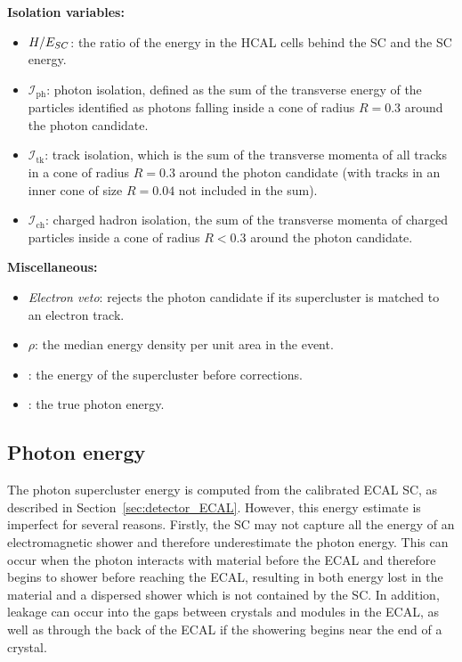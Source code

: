 \textbf{Isolation variables:}
\begin{itemize}[noitemsep]
  \item $H/E_{SC}$: the ratio of the energy in the HCAL cells behind the SC 
    and the SC energy.
  \item \emph{$\mathcal{I}_{\text{ph}}$}: 
    photon isolation,
    defined as the sum of the transverse energy of the particles
    identified as photons falling inside a cone of radius
    $R=0.3$
    around the photon candidate.
  \item \emph{$\mathcal{I}_{\text{tk}}$}: 
    track isolation, which is 
    the sum of the transverse momenta
    of all tracks in a cone of radius $R=0.3$
    around the photon candidate (with tracks in an
    inner cone of size $R=0.04$ not included in the sum).
  \item \emph{$\mathcal{I}_{\text{ch}}$}: 
    charged hadron isolation,
    the sum of the transverse momenta of
    charged particles inside a cone of radius $R<0.3$ around the
    photon candidate.
\end{itemize}

\textbf{Miscellaneous:}
\begin{itemize}[noitemsep]
  \item \emph{Electron veto}: rejects the photon candidate if its 
    supercluster is matched to an electron track.
  \item \emph{$\rho$}: the median energy  density per unit area in the event.
  \item \emph{\Eraw}: the energy of the supercluster before corrections.
  \item \emph{\Etrue}: the true photon energy.
\end{itemize}

\subsection{Photon energy}

The photon supercluster energy is computed from the calibrated ECAL SC, as described in Section~\ref{sec:detector_ECAL}.
However, this energy estimate is imperfect for several reasons.
Firstly, the SC may not capture all the energy of an electromagnetic shower and therefore underestimate the photon energy.
This can occur when the photon interacts with material before the ECAL and therefore begins to shower before reaching the ECAL, 
resulting in both energy lost in the material and a dispersed shower which is not contained by the SC.
In addition, leakage can occur into the gaps between crystals and modules in the ECAL, 
as well as through the back of the ECAL if the showering begins near the end of a crystal.

